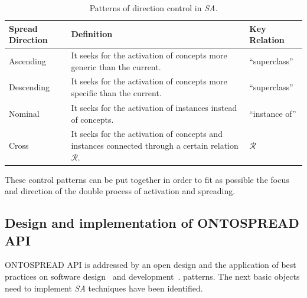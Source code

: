 \documentclass{llncs}
\begin{document}
\begin{table}[htb]

    \begin{tabular}{|p{3cm}|p{6cm}|p{3cm}|}
     \hline
      \textbf{Spread Direction} & \textbf{Definition} & \textbf{Key Relation} \\
        
	\hline
  	 Ascending& It seeks for the activation of concepts more generic than
the current. & ``superclass''\\
	\hline
  	 Descending& It seeks for the activation of concepts more specific than
the current. & ``superclass''\\
	\hline
  	 Nominal& It seeks for the activation of instances instead of concepts. &
``instance of'' \\
	\hline
  	 Cross&  It seeks for the activation of concepts and instances connected
through a certain relation $\mathcal{R}$.  & $\mathcal{R}$ \\
     \hline

    \hline	
    \end{tabular}
    \caption{Patterns of direction control in \textit{SA}.}
\label{guidingspreading}
\end{table} 

These control patterns can be put together in order to fit as possible the focus
and direction of the double process of activation and spreading.

\subsection{Design and implementation of ONTOSPREAD API}
ONTOSPREAD API is addressed by an open design and 
the application of best practices on software design~\cite{Gamma,CoreJ2ee} and development~\cite{XP,Fowler1999}.
patterns. The next basic objects need to implement \textit{SA} techniques have been identified.
\end{document}
